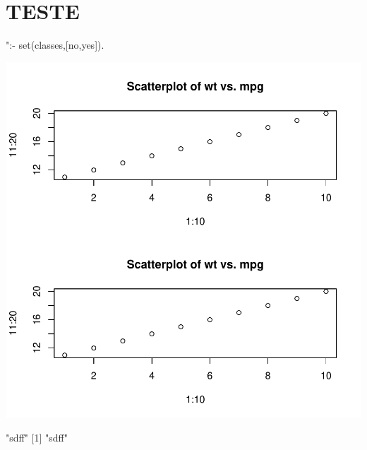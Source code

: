 \documentclass{article}
\begin{document}






\section{TESTE}


\begin{Schunk}
\begin{Soutput}
[1] ":- set(classes,[no,yes]).\n%
\end{Soutput}
\end{Schunk}

\includegraphics{teste-002}


\begin{Schunk}
\begin{Soutput}
[1] "sdff"
[1] "sdff"
\end{Soutput}
\end{Schunk}
\end{document}
